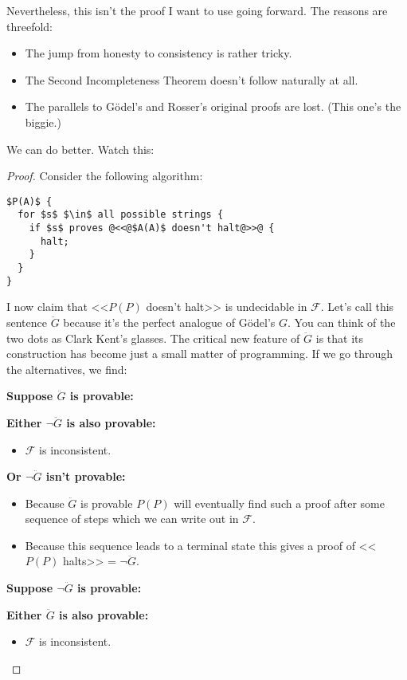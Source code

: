 \documentclass{article}
\theoremstyle{theorem}
\newcommand{\nameditem}[1]{\item\textbf{#1}}
\newcommand{\impl}{\item[$\Rightarrow$]}
\begin{document}
Nevertheless, this isn't the proof I want to use going forward. The reasons are threefold:
\begin{itemize}
\item The jump from honesty to consistency is rather tricky.
\item The Second Incompleteness Theorem doesn't follow naturally at all.
\item The parallels to Gödel's and Rosser's original proofs are lost. (This one's the biggie.)
\end{itemize}
We can do better. Watch this:
\begin{proof}
Consider the following algorithm:\\[0.5em]
\begin{minipage}{\linewidth}
\begin{lstlisting}
$P(A)$ {
  for $s$ $\in$ all possible strings {
    if $s$ proves @<<@$A(A)$ doesn't halt@>>@ {
      halt;
    }
  }
}
\end{lstlisting}
\end{minipage}
I now claim that <<$P(P)$ doesn't halt>> is undecidable in $\mathcal{F}$. Let's call this sentence $\ddot{G}$ because it's the perfect analogue of Gödel's $G$. You can think of the two dots as Clark Kent's glasses. The critical new feature of $\ddot{G}$ is that its construction has become just a small matter of programming. If we go through the alternatives, we find:
\begin{description}
\nameditem{Suppose $\ddot{G}$ is provable:}
\begin{description}
\nameditem{Either $\neg \ddot{G}$ is also provable:}
\begin{itemize}
\impl $\mathcal{F}$ is inconsistent. \lightning
\end{itemize}
\nameditem{Or $\neg \ddot{G}$ isn't provable:}
\begin{itemize}
\impl Because $\ddot{G}$ is provable $P(P)$ will eventually find such a proof after some sequence of steps which we can write out in $\mathcal{F}$.
\impl Because this sequence leads to a terminal state this gives a proof of <<$P(P)$ halts>> = $\neg \ddot{G}$. \lightning
\end{itemize}
\end{description}
\nameditem{Suppose $\neg \ddot{G}$ is provable:}
\begin{description}
\nameditem{Either $\ddot{G}$ is also provable:}
\begin{itemize}
\impl $\mathcal{F}$ is inconsistent. \lightning
\end{itemize}

\end{description}
\end{description}
\end{proof}
\end{document}
